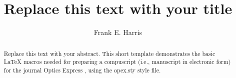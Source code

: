
\title{Replace this text with your title}

\author{Frank E. Harris}
\address{Optical Society of America, Washington, DC, USA}

\begin{abstract}Replace this text with your abstract.
This short template demonstrates the basic LaTeX macros 
needed for preparing a compuscript (i.e., manuscript in 
electronic form) for the journal Optics Express , using 
the opex.sty style file.  
\end{abstract}

